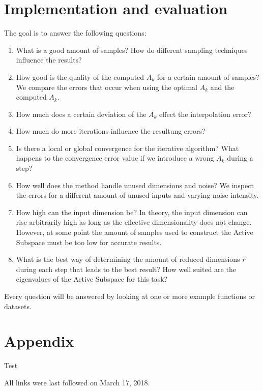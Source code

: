 \documentclass[
  a4paper,  %
  twoside,  %
  bibliography=totoc,
  headsepline,
  cleardoublepage=empty,
  parskip=half,
  draft=false
]{scrbook}
\begin{document}
\chapter{Implementation and evaluation}

The goal is to answer the following questions:

\begin{enumerate}
\item What is a good amount of samples? How do different sampling techniques influence the results?

\item How good is the quality of the computed $A_k$ for a certain amount of samples? We compare the errors that occur when using the optimal $A_k$ and the computed $A_k$.

\item How much does a certain deviation of the $A_k$ effect the interpolation error?

\item How much do more iterations influence the resultung errors?

\item Is there a local or global convergence for the iterative algorithm? What happens to the convergence error value if we introduce a wrong $A_k$ during a step?

\item How well does the method handle unused dimensions and noise? We inspect the errors for a different amount of unused inputs and varying noise intensity.

\item How high can the input dimension be? In theory, the input dimension can rise arbitrarily high as long as the effective dimensionality does not change. However, at some point the amount of samples used to construct the Active Subspace must be too low for accurate results.

\item What is the best way of determining the amount of reduced dimensions $r$ during each step that leads to the best result? How well suited are the eigenvalues of the Active Subspace for this task?
\end{enumerate}

Every question will be answered by looking at one or more example functions or datasets.

\appendix


\chapter{Appendix}


Test

\newpage
\printbibliography

All links were last followed on March 17, 2018.


\pagestyle{empty}
\renewcommand*{\chapterpagestyle}{empty}
\Versicherung
\end{document}
